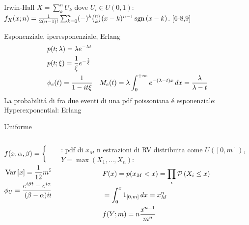 \begin{frame}{Irwin-Hall}
$X=\sum_k^nU_k$ dove $U_i\in U(0,1)$: $f_X(x;n)=\frac{1}{2(n-1)!}\sum_{k=0}^n(-)^k\binom{n}{k}(x-k)^{n-1}\operatorname{sgn}{(x-k)}$.
[6-8,9]
    
\end{frame}

\begin{frame}{Esponenziale, iperesponenziale, Erlang}
\begin{align*}
&p(t;\lambda)=\lambda e^{-\lambda t}\\
&p(t;\xi)=\frac{1}{\xi}e^{-\frac{t}{\xi}}\\
&\phi_e(t)=\frac{1}{1-it\xi}
&M_e(t)=\lambda\int_{0}^{+\infty}{}e^{-(\lambda-t)x}\,dx=\frac{\lambda}{\lambda-t}
\end{align*}
La probabilit\'a di fra due eventi di una pdf poissoniana \'e esponenziale: 
Hyperexponential:
Erlang
\end{frame}

\begin{frame}{Uniforme}
\begin{columns}[T]
	\begin{column}{0.5\textwidth}
	\begin{align*}
	&f(x;\alpha,\beta)=\left\{\begin{array}{c}\frac{1}{\beta-\alpha}\\0\\
	\end{array}\right.\\
	&\operatorname{Var}{[x]}=\frac{1}{12}m^2\\
	&\phi_U=\frac{e^{i\beta t}-e^{i\alpha t}}{(\beta-\alpha)it}
	\end{align*}
	\end{column}
	\begin{column}{0.5\textwidth}
	\begin{block}{: pdf di $x_M$}
		n estrazioni di RV distribuita come $U([0,m])$, $Y=\max{(X_1,\ldots,X_n)}$:
		\begin{align*}
		&F(x)=p(x_M<x)=\prod_i\operatorname{\mathcal{P}}{(X_i\leq x)}\\
		&=\int_0^x1_{[0,m]}\,dx=x_M^n\\
		&f(Y;m)=n\frac{x^{n-1}}{m^n}
		\end{align*}
	\end{block}
\end{column}
\end{columns}
\end{frame}

